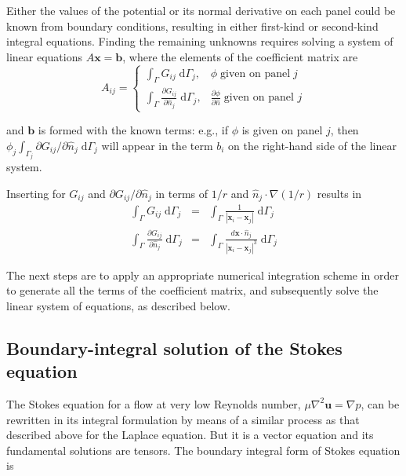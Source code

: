 \documentclass[final,leqno,]{siamltex1213}
\newcommand{\di}[1]{\text{d}#1}
\newcommand{\partiald}[2]{\frac{\partial #1}{\partial #2}}
\newcommand{\partialdi}[2]{\partial #1 / \partial #2}
\newcommand{\nhat}{\hat{n}}
\newcommand{\vect}[1]{\mathbf{#1}}
\begin{document}
Either the values of the potential or its normal derivative on each panel could be known from boundary conditions, resulting in either first-kind or second-kind integral equations. Finding the remaining unknowns requires solving a system of linear equations $A\vect{x}=\vect{b}$, where the elements of the coefficient matrix are
%
\begin{equation} \label{eqn:laplace_matrix}
	A_{ij} = 
	\begin{cases}
		\int_{\Gamma} G_{ij}\;\di{\Gamma_j}, & \phi\;\text{given on panel}\;j \\
		\int_{\Gamma} \partiald{G_{ij}}{\nhat_j}\;\di{\Gamma_j}, & \partiald{\phi}{\nhat}\;\text{given on panel } j
	\end{cases}
\end{equation}

\noindent
and $\vect{b}$ is formed with the known terms: e.g., if $\phi$ is given on panel $j$, then $\phi_j\int_{\Gamma_j}\partialdi{G_{ij}}{\nhat_j}\;\di{\Gamma_j}$ will appear in the term $b_i$ on the right-hand side of the linear system.

Inserting for $G_{ij}$ and $\partialdi{G_{ij}}{\nhat_j}$ in terms of $1/r$ and $\nhat_j\cdot\nabla(1/r)$ results in
%
\begin{eqnarray}
	\label{eqn:laplace_bem_G}\int_{\Gamma} G_{ij}\;\di{\Gamma_j} & = & \int_{\Gamma} \frac{1}{|\vect{x}_i-\vect{x}_j|} \;\di{\Gamma_j} \\ 
	\label{eqn:laplace_bem_dGdn}\int_{\Gamma} \partiald{G_{ij}}{\nhat_j}\;\di{\Gamma_j} & = & \int_{\Gamma}\frac{d\vect{x}\cdot\nhat_j}{|\vect{x}_i-\vect{x}_j|^{3}}\;\di{\Gamma_j}
\end{eqnarray}

The next steps are to apply an appropriate numerical integration scheme in order to generate all the terms of the coefficient matrix, and subsequently solve the linear system of equations, as described below.

\subsection{Boundary-integral solution of the Stokes equation}

The Stokes equation for a flow at very low Reynolds number, $\mu\nabla^{2}\vect{u} =  \nabla p$, can be rewritten in its integral formulation by means of a similar process as that described above for the Laplace equation. But it is a vector equation and its fundamental solutions are tensors. The boundary integral form of Stokes equation is
\end{document}
